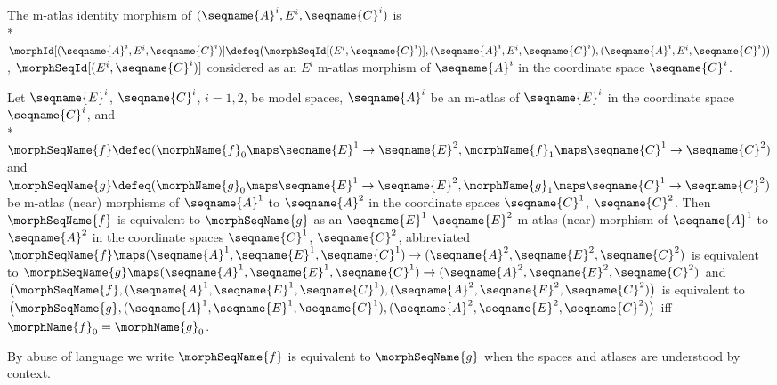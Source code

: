 \documentclass{article}
\begin{document}
\begin{definition}
The m-atlas identity morphism of
$(\seqname{A}^i, E^i, \seqname{C}^i)$ is \\*
$
\morphId[{{(\seqname{A}^i, E^i, \seqname{C}^i)}}] \defeq
\bigl (
  \morphSeqId[{{(E^i,\seqname{C}^i)}}],
  (\seqname{A}^i, E^i, \seqname{C}^i),
  (\seqname{A}^i, E^i, \seqname{C}^i)
\bigr )
$,\hspace{1pt}
$
 \morphSeqId%
   [
     {(E^i, \seqname{C}^i)}
   ]
$
considered as an $E^i$ m-atlas morphism of $\seqname{A}^i$ in
the coordinate space $\seqname{C}^i$.
\end{definition}

\begin{definition}
\label{def:M-ATLmorphequiv}
Let $\seqname{E}^i$, $\seqname{C}^i$, $i=1,2$, be model spaces,
$\seqname{A}^i$ be an m-atlas of $\seqname{E}^i$ in the coordinate space
$\seqname{C}^i$, and \\*
$
  \morphSeqName{f} \defeq
  (
    \morphName{f}_0 \maps \seqname{E}^1 \to \seqname{E}^2,
    \morphName{f}_1 \maps \seqname{C}^1 \to \seqname{C}^2
  )
$ and
$
  \morphSeqName{g} \defeq
  (
    \morphName{g}_0 \maps \seqname{E}^1 \to \seqname{E}^2,
    \morphName{g}_1 \maps \seqname{C}^1 \to \seqname{C}^2
  )
$
be m-atlas (near) morphisms of $\seqname{A}^1$ to $\seqname{A}^2$ in the
coordinate spaces $\seqname{C}^1$, $\seqname{C}^2$.  Then
$\morphSeqName{f}$ is equivalent to $\morphSeqName{g}$ as an
$\seqname{E}^1$-$\seqname{E}^2$ m-atlas (near) morphism of
$\seqname{A}^1$ to $\seqname{A}^2$ in the coordinate spaces
$\seqname{C}^1$, $\seqname{C}^2$, abbreviated
$
  \morphSeqName{f} \maps
  (\seqname{A}^1, \seqname{E}^1, \seqname{C}^1) \to
  (\seqname{A}^2, \seqname{E}^2, \seqname{C}^2)
$
is equivalent to
$
  \morphSeqName{g} \maps
  (\seqname{A}^1, \seqname{E}^1, \seqname{C}^1) \to
  (\seqname{A}^2, \seqname{E}^2, \seqname{C}^2)
$
and
$
  \bigl (
    \morphSeqName{f},
    (\seqname{A}^1, \seqname{E}^1, \seqname{C}^1),
    (\seqname{A}^2, \seqname{E}^2, \seqname{C}^2)
  \bigr )
$
is equivalent to
$
  \bigl (
    \morphSeqName{g},
    (\seqname{A}^1, \seqname{E}^1, \seqname{C}^1),
    (\seqname{A}^2, \seqname{E}^2, \seqname{C}^2)
  \bigr )
$
iff $\morphName{f}_0 = \morphName{g}_0$.

By abuse of language we write $\morphSeqName{f}$ is equivalent to
$\morphSeqName{g}$ when the spaces and atlases are understood by context.


\end{definition}
\end{document}
